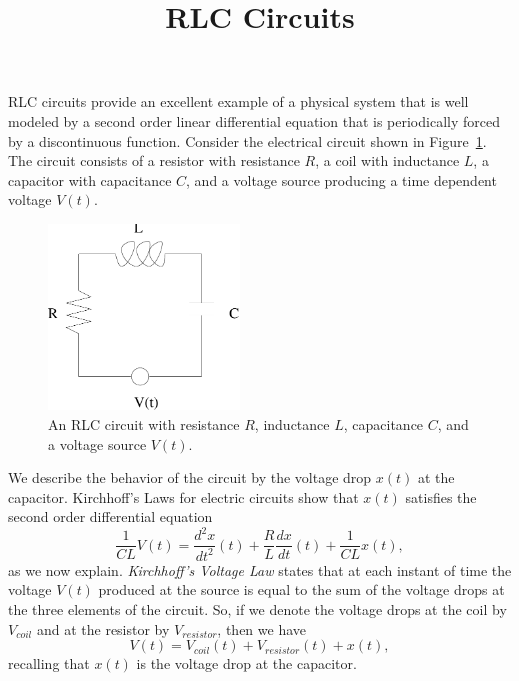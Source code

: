 \documentclass{ximera}
\title{RLC Circuits}
\begin{document}
\begin{abstract}
\end{abstract}
\maketitle

  \label{S:SOFE}

RLC circuits provide an excellent example of a physical system that is well
modeled by a second order linear differential equation that is periodically 
forced by a discontinuous function.  Consider the electrical circuit shown in 
Figure~\ref{fig:rcl}.  The circuit consists of a resistor with
resistance $R$, a coil with inductance $L$, a 
capacitor with 
capacitance $C$, and a voltage source producing a time 
dependent voltage $V(t)$.    
\begin{figure}[htb]
           \centerline{%
           \includegraphics[width=2.0in]{../figures/rcl.pdf}}
           \caption{An RLC circuit with resistance $R$, inductance $L$,
	   capacitance $C$, and a voltage source $V(t)$.}
           \label{fig:rcl}
\end{figure}

We describe the behavior of the circuit by the voltage drop $x(t)$ at the 
capacitor.  Kirchhoff's Laws 
for electric circuits show that $x(t)$ satisfies 
the second order differential equation
\begin{equation}  \label{e:eleccirc}
\frac{1}{CL}V(t) = \frac{d^2x}{dt^2}(t) + \frac{R}{L}\frac{dx}{dt}(t) + 
\frac{1}{CL}x(t),
\end{equation}
as we now explain.   {\em Kirchhoff's Voltage 
Law\/} states that at each
instant of time the voltage $V(t)$ produced at the source is
equal to the sum of the voltage drops at the three elements of
the circuit.  So, if we denote the voltage drops at the coil
by $V_{coil}$ and at the resistor by $V_{resistor}$, then 
we have 
\begin{equation}  \label{e:kirchhoff}
V(t) = V_{coil}(t) + V_{resistor}(t) + x(t),
\end{equation}
recalling that $x(t)$ is the voltage drop at the capacitor.
\end{document}
